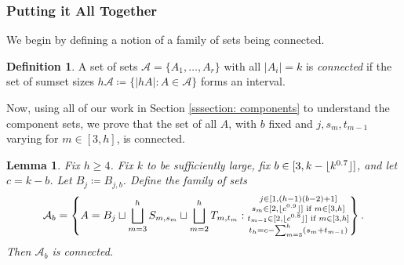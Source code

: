 \documentclass[10pt,a4paper]{article}
\newtheorem{lemma}[theorem]{Lemma}
\theoremstyle{definition}
\newtheorem{definition}[theorem]{Definition}
\theoremstyle{remark}
\numberwithin{equation}{section}
\numberwithin{theorem}{section}
\newcommand{\cala}{\mathcal{A}}
\DeclarePairedDelimiter{\floor}{\lfloor}{\rfloor}
\begin{document}
\subsubsection{Putting it All Together}\label{sssection: finish}
We begin by defining a notion of a family of sets being connected.
\begin{definition}
    A set of sets $\cala = \{A_1,\ldots,A_r\}$ with all $|A_i| = k$ is \emph{connected} if the set of sumset sizes $h\cala \coloneq  \{|hA|:A \in \cala\}$ forms an interval.
\end{definition}
Now, using all of our work in Section \ref{sssection: components} to understand the component sets, we prove that the set of all $A$, with $b$ fixed and $j,s_m,t_{m-1}$ varying for $m \in [3,h]$, is connected.
\begin{lemma}\label{lemmaAb}
    Fix $h \geq 4$. Fix $k$ to be sufficiently large, fix $b \in [3,k-\floor{k^{0.7}}]$, and let $c = k-b$. Let $B_j\coloneq B_{j,b}$. Define the family of sets \[\cala_b = \left\{A = B_j \sqcup \bigsqcup_{m=3}^h S_{m,s_m} \sqcup \bigsqcup_{m=2}^h T_{m,t_m}:\substack{j \in [1,(h-1)(b-2)+1] \\ s_m \in [2,\floor{c^{0.9}}] \textnormal{ if }m \in [3,h] \\ t_{m-1} \in [2,\floor{c^{0.8}}]\textnormal{ if } m \in [3,h] \\
    t_h = c-\sum_{m=3}^h(s_m+t_{m-1})} 
    \right\}.\] Then $\cala_b$ is connected.
\end{lemma}
\end{document}
